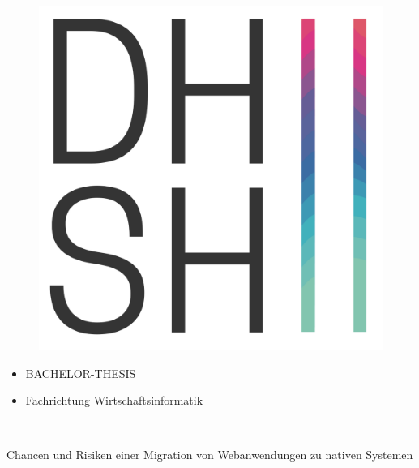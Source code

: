 \documentclass[a4paper]{scrartcl}
\begin{document}

\begin{minipage}{0.2\textwidth}
	\begin{figure}[H]
		\includegraphics[scale=0.25]{_assets/logo_DHSH}
	\end{figure}
\end{minipage} \hfill
\begin{minipage}{0.68\textwidth}
	\begin{itemize}
		\item[] \huge BACHELOR-THESIS
		\item[] \large Fachrichtung Wirtschaftsinformatik
	\end{itemize}
\end{minipage} \\


\begin{center}
	\LARGE Chancen und Risiken einer Migration von Webanwendungen zu nativen Systemen 
\end{center}
\end{document}
